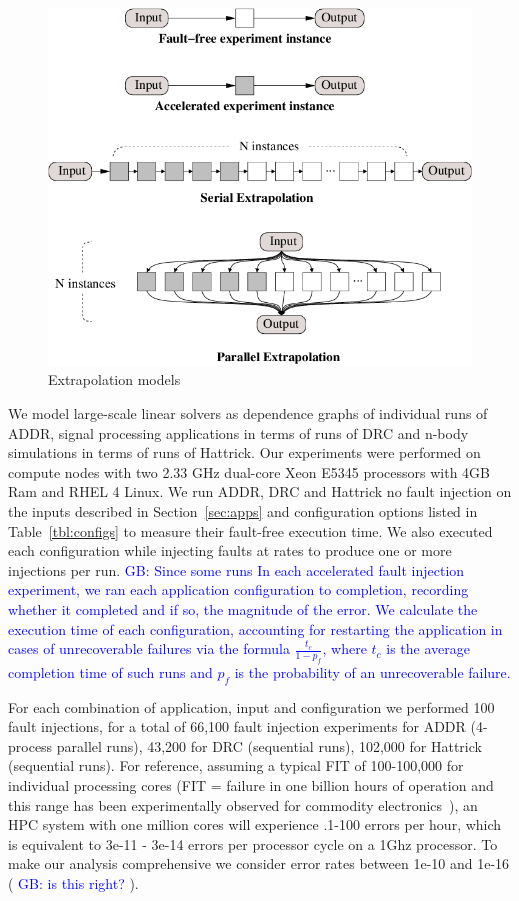\documentclass[10pt, conference, compsocconf]{IEEEtran}
\newcommand{\greg}[1]{%
  \textcolor{blue}{GB: #1}
}
\begin{document}
\begin{figure}[ht!]
\centering
\includegraphics[width=1.00\columnwidth]{figs/extrapolates.png}
\caption{Extrapolation models}
\label{fig:extrapolations}
\end{figure}

We model large-scale linear solvers as dependence graphs of individual runs of ADDR, signal processing applications in terms of runs of DRC and n-body simulations in terms of runs of Hattrick.
Our experiments were performed on compute nodes with two 2.33 GHz dual-core Xeon E5345 processors with 4GB Ram and RHEL 4 Linux.
We run ADDR, DRC and Hattrick no fault injection on the inputs described in Section~\ref{sec:apps} and configuration options listed in Table~\ref{tbl:configs} to measure their fault-free execution time.
We also executed each configuration while injecting faults at rates to produce one or more injections per run.%
\greg{Since some runs
In each accelerated fault injection experiment, we ran each application configuration to completion, recording whether it completed and if so, the magnitude of the
	error.
	We calculate the execution time of each configuration, accounting for restarting the application in cases of unrecoverable failures via the formula $\frac{t_c}{1-p_f}$, where $t_c$ is the average completion time of such runs and $p_f$ is the probability of an unrecoverable failure.}
For each combination of application, input and configuration we performed 100 fault injections, for a total of 66,100 fault injection experiments for ADDR (4-process parallel runs), 43,200 for DRC (sequential runs), 102,000 for Hattrick (sequential runs).
For reference, assuming a typical FIT of 100-100,000 for individual processing cores (FIT = failure in one billion hours of operation and this range has been experimentally observed for commodity electronics~\cite{mem_errors:2010, dram_error:2009}), an HPC system with one million cores will experience .1-100 errors per hour, which is equivalent to 3e-11 - 3e-14 errors per processor cycle on a 1Ghz processor.
To make our analysis comprehensive we consider error rates between 1e-10 and 1e-16 (\greg{is this right?}).
\end{document}
